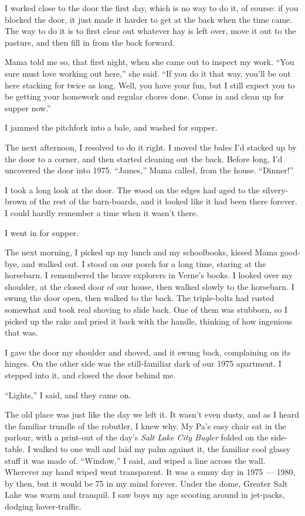 I worked close to the door the first day, which is no way to do it,
of course: if you blocked the door, it just made it harder to get
at the back when the time came. The way to do it is to first clear
out whatever hay is left over, move it out to the pasture, and then
fill in from the back forward.

Mama told me so, that first night, when she came out to inspect my
work. ``You sure must love working out here,'' she said.
``If you do it that way, you'll be out here stacking for twice as long. Well, 
you have your fun, but I still expect you to be getting your homework and 
regular chores done. Come in and clean up for supper now.''

I jammed the pitchfork into a bale, and washed for supper.

The next afternoon, I resolved to do it right. I moved the bales
I'd stacked up by the door to a corner, and then started cleaning
out the back. Before long, I'd uncovered the door into 1975.
``James,'' Mama called, from the house. ``Dinner!''

I took a long look at the door. The wood on the edges had aged to
the silvery-brown of the rest of the barn-boards, and it looked
like it had been there forever. I could hardly remember a time when
it wasn't there.

I went in for supper.

The next morning, I picked up my lunch and my schoolbooks, kissed
Mama good-bye, and walked out. I stood on our porch for a long
time, staring at the horsebarn. I remembered the brave explorers in
Verne's books. I looked over my shoulder, at the closed door of our
house, then walked slowly to the horsebarn. I swung the door open,
then walked to the back. The triple-bolts had rusted somewhat and
took real shoving to slide back. One of them was stubborn, so I
picked up the rake and pried it back with the handle, thinking of
how ingenious that was.

I gave the door my shoulder and shoved, and it swung back,
complaining on its hinges. On the other side was the still-familiar
dark of our 1975 apartment. I stepped into it, and closed the door
behind me.

``Lights,'' I said, and they came on.

The old place was just like the day we left it. It wasn't even
dusty, and as I heard the familiar trundle of the robutler, I knew
why. My Pa's easy chair sat in the parlour, with a print-out of the
day's \emph{Salt Lake City Bugler} folded on the side-table. I
walked to one wall and laid my palm against it, the familiar cool
glassy stuff it was made of. ``Window,'' I said, and wiped a line
across the wall. Wherever my hand wiped went transparent. It was a
sunny day in 1975 --- 1980, by then, but it would be 75 in my mind
forever. Under the dome, Greater Salt Lake was warm and tranquil. I
saw boys my age scooting around in jet-packs, dodging
hover-traffic.


